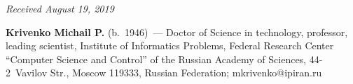 
\hfill{\small\textit{Received August 19, 2019}}



\Contrl

\noindent
\textbf{Krivenko Michail P.} (b.\ 1946)~--- Doctor of Science in technology, 
professor, leading scientist, Institute of Informatics Problems, Federal Research 
Center ``Computer Science and Control'' of the Russian Academy of Sciences,  
44-2~Vavilov Str., Moscow 119333, Russian Federation; 
\mbox{mkrivenko@ipiran.ru}
\label{end\stat}

\renewcommand{\bibname}{\protect\rm Литература}